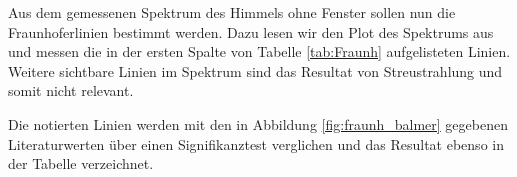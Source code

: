 \documentclass{article}
\begin{document}
Aus dem gemessenen Spektrum des Himmels ohne Fenster sollen nun die Fraunhoferlinien bestimmt werden. Dazu lesen wir den Plot des Spektrums aus und messen die in der ersten Spalte von Tabelle \ref{tab:Fraunh} aufgelisteten Linien. Weitere sichtbare Linien im Spektrum sind das Resultat von Streustrahlung und somit nicht relevant.

Die notierten Linien werden mit den in Abbildung \ref{fig:fraunh_balmer} gegebenen Literaturwerten über einen Signifikanztest verglichen und das Resultat ebenso in der Tabelle verzeichnet.

\phantom{.}

\begin{table}[!h]
    \caption{Gemessene Fraunhoferlinien und Zuordnung}
    \label{tab:Fraunh}
\end{table}
\end{document}
